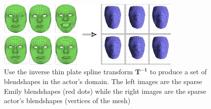 \documentclass[11pt]{report}
\begin{document}
\begin{figure}[htbp!]
        \centering
        \includegraphics[width=0.8\textwidth]{img/EtoRblends}
        \caption{Use the inverse thin plate spline transform $\mathbf{T^{-1}}$ to produce a set of blendshapes in the actor's domain. The left images are the sparse Emily blendshapes (red dots) while the right images are the sparse actor's blendshapes (vertices of the mesh)}\label{fig:EtoR}
\end{figure}
\end{document}
